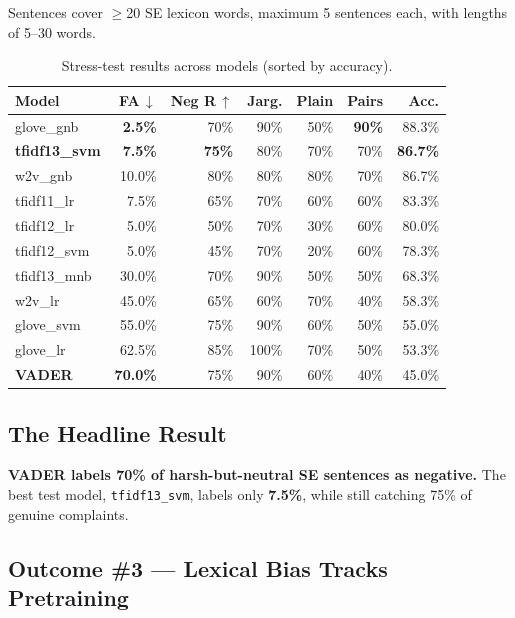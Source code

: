 \documentclass[11pt,a4paper]{article}
\begin{document}
Sentences cover $\geq$20 SE lexicon words, maximum 5 sentences each, with lengths of 5--30 words.

\begin{table}[H]
\centering
\caption{Stress-test results across models (sorted by accuracy).}
\label{tab:stress}
\footnotesize
\begin{tabular}{lrrrrrr}
\toprule
\textbf{Model} & \textbf{FA\,$\downarrow$} & \textbf{Neg R\,$\uparrow$} & \textbf{Jarg.} & \textbf{Plain} & \textbf{Pairs} & \textbf{Acc.} \\
\midrule
glove\_gnb        & \textbf{2.5\%}  & 70\%  & 90\% & 50\% & \textbf{90\%} & 88.3\% \\
\textbf{tfidf13\_svm} & \textbf{7.5\%} & \textbf{75\%} & 80\% & 70\% & 70\% & \textbf{86.7\%} \\
w2v\_gnb          & 10.0\% & 80\%  & 80\% & 80\% & 70\% & 86.7\% \\
tfidf11\_lr       & 7.5\%  & 65\%  & 70\% & 60\% & 60\% & 83.3\% \\
tfidf12\_lr       & 5.0\%  & 50\%  & 70\% & 30\% & 60\% & 80.0\% \\
tfidf12\_svm      & 5.0\%  & 45\%  & 70\% & 20\% & 60\% & 78.3\% \\
tfidf13\_mnb      & 30.0\% & 70\%  & 90\% & 50\% & 50\% & 68.3\% \\
w2v\_lr           & 45.0\% & 65\%  & 60\% & 70\% & 40\% & 58.3\% \\
glove\_svm        & 55.0\% & 75\%  & 90\% & 60\% & 50\% & 55.0\% \\
glove\_lr         & 62.5\% & 85\%  & 100\%& 70\% & 50\% & 53.3\% \\
\textbf{VADER}    & \textbf{70.0\%} & 75\%  & 90\% & 60\% & 40\% & 45.0\% \\
\bottomrule
\end{tabular}
\end{table}

\subsection{The Headline Result}

\textbf{VADER labels 70\% of harsh-but-neutral SE sentences as negative.} The best test model, \texttt{tfidf13\_svm}, labels only \textbf{7.5\%}, while still catching 75\% of genuine complaints.

\subsection{Outcome \#3 --- Lexical Bias Tracks Pretraining}
\end{document}
